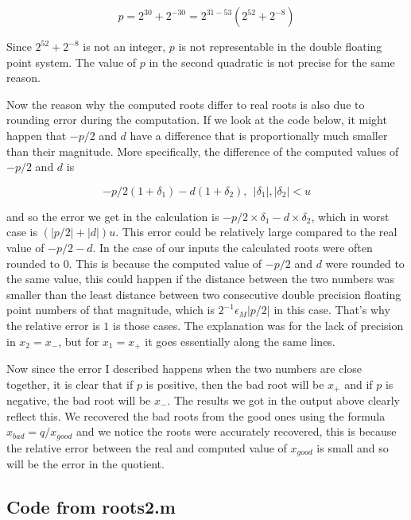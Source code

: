 \documentclass{article}
\begin{document}
\begin{equation*}
   p = 2^{30} + 2^{-30} = 2^{31 - 53}(2^{52} + 2^{-8})
\end{equation*}

Since $2^{52} + 2^{-8}$ is not an integer, $p$ is not representable
in the double floating point system.
The value of $p$ in the second quadratic is not precise for the
same reason.

Now the reason why the computed roots differ to real roots is also
due to rounding error during the computation. If we look at the
code below, it might happen that $-p/2$ and $d$ have a difference
that is proportionally much smaller than their magnitude.
More specifically, the difference of the computed values of
$-p/2$ and $d$ is

\begin{equation*}
   -p/2(1 + \delta_1) - d(1 + \delta_2), ~~|\delta_1|,|\delta_2| < u
\end{equation*}

and so the error we get in the calculation is
$-p/2\times\delta_1 - d\times\delta_2$, which in worst case is
$(|p/2| + |d|)u$. This error could be relatively large compared to
the real value of $-p/2 - d$. In the case of our inputs the
calculated roots were often rounded to $0$. This is because the
computed value of $-p/2$ and $d$ were rounded to the same value,
this could happen if the distance between the two numbers was
smaller than the least distance between two consecutive
double precision floating point numbers of that magnitude,
which is $2^{-1}\epsilon_M|p/2|$ in this case. That's why
the relative error is $1$ is those cases. The explanation was for
the lack of precision in $x_2 = x_-$,
but for $x_1 = x_+$ it goes essentially
along the same lines.

Now since the error I described happens when the two numbers are
close together, it is clear that if $p$ is positive, then the bad
root will be $x_+$ and if $p$ is negative, the bad root will be
$x_-$. The results we got in the output above clearly reflect this.
We recovered the bad roots from the good ones using the formula
$x_{bad} = q / x_{good}$ and we notice the roots were accurately
recovered, this is because the relative error between the real and
computed value of $x_{good}$ is small and so will be the error
in the quotient.

\subsection*{Code from roots2.m}
\end{document}
